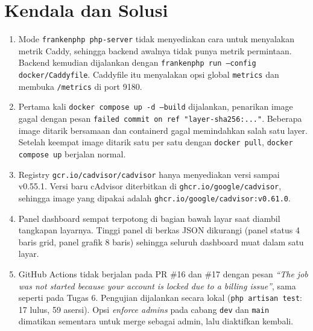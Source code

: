 \documentclass[a4paper,oneside,12pt]{report}
\begin{document}
\chapter{Kendala dan Solusi}\label{chap:kendala}
\begin{enumerate}
    \item Mode \texttt{frankenphp php-server} tidak menyediakan cara untuk menyalakan metrik Caddy, sehingga backend awalnya tidak punya metrik permintaan. Backend kemudian dijalankan dengan \texttt{frankenphp run --config docker/Caddyfile}. Caddyfile itu menyalakan opsi global \texttt{metrics} dan membuka \texttt{/metrics} di port 9180.
    \item Pertama kali \texttt{docker compose up -d --build} dijalankan, penarikan image gagal dengan pesan \texttt{failed commit on ref "layer-sha256:..."}. Beberapa image ditarik bersamaan dan containerd gagal memindahkan salah satu layer. Setelah keempat image ditarik satu per satu dengan \texttt{docker pull}, \texttt{docker compose up} berjalan normal.
    \item Registry \texttt{gcr.io/cadvisor/cadvisor} hanya menyediakan versi sampai v0.55.1. Versi baru cAdvisor diterbitkan di \texttt{ghcr.io/google/cadvisor}, sehingga image yang dipakai adalah \texttt{ghcr.io/google/cadvisor:v0.61.0}.
    \item Panel dashboard sempat terpotong di bagian bawah layar saat diambil tangkapan layarnya. Tinggi panel di berkas JSON dikurangi (panel status 4 baris grid, panel grafik 8 baris) sehingga seluruh dashboard muat dalam satu layar.
    \item GitHub Actions tidak berjalan pada PR \#16 dan \#17 dengan pesan \textit{``The job was not started because your account is locked due to a billing issue''}, sama seperti pada Tugas 6. Pengujian dijalankan secara lokal (\texttt{php artisan test}: 17 lulus, 59 asersi). Opsi \textit{enforce admins} pada cabang \texttt{dev} dan \texttt{main} dimatikan sementara untuk merge sebagai admin, lalu diaktifkan kembali.
\end{enumerate}

\clearpage
\end{document}

